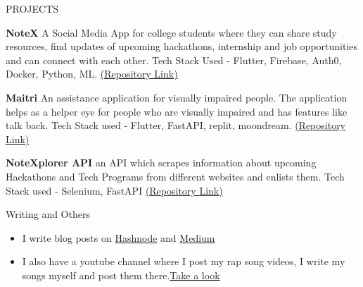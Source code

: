 \documentclass{resume} %
\begin{document}
\begin{rSection}{PROJECTS}
\vspace{-1.25em}
\item \textbf{NoteX} {A Social Media App for college students where they can share study resources, find updates of upcoming hackathons, internship and job opportunities and can connect with each other. Tech Stack Used - Flutter, Firebase, Auth0, Docker, Python, ML. \href{https://github.com/Tech-Emcees/NoteX}{(Repository Link)}}


\item \textbf{Maitri} {An assistance application for visually impaired people. The application helps as a helper eye for people who are visually impaired and has features like talk back. Tech Stack used - Flutter, FastAPI, replit, moondream. \href{https://github.com/HashBr0wns/maitri-frontend}{(Repository Link)}}

\item \textbf{NoteXplorer API} {an API which scrapes information about upcoming Hackathons and Tech Programs from different websites and enlists them. Tech Stack used - Selenium, FastAPI \href{https://github.com/TeeWrath/NoteXplorer-API}{(Repository Link)}}


\end{rSection}

\begin{rSection}{Writing and Others} 
\begin{itemize}
    \item  I write blog posts on \href{https://subwrites.hashnode.dev/}{Hashnode} and \href{https://medium.com/@subroto.2003}{Medium} 
    \item	I also have a youtube channel where I post my rap song videos, I write my songs myself and post them there.\href{https://www.youtube.com/@subrotobanerjee4885/featured}{Take a look}
\end{itemize}


\end{rSection}

\end{document}

